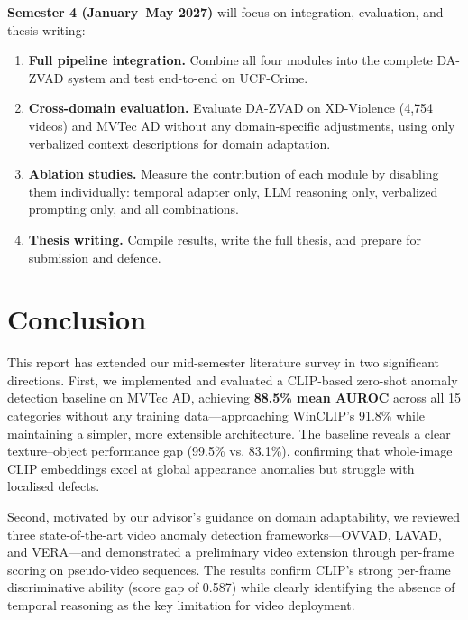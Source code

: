 \noindent\textbf{Semester 4 (January--May 2027)} will focus on integration, evaluation, and thesis writing:

\begin{enumerate}[leftmargin=*]
    \item \textbf{Full pipeline integration.} Combine all four modules into the complete DA-ZVAD system and test end-to-end on UCF-Crime.

    \item \textbf{Cross-domain evaluation.} Evaluate DA-ZVAD on XD-Violence (4{,}754 videos) and MVTec AD without any domain-specific adjustments, using only verbalized context descriptions for domain adaptation.

    \item \textbf{Ablation studies.} Measure the contribution of each module by disabling them individually: temporal adapter only, LLM reasoning only, verbalized prompting only, and all combinations.

    \item \textbf{Thesis writing.} Compile results, write the full thesis, and prepare for submission and defence.
\end{enumerate}


\section{Conclusion}
\label{sec:conclusion}

This report has extended our mid-semester literature survey in two significant directions. First, we implemented and evaluated a CLIP-based zero-shot anomaly detection baseline on MVTec AD, achieving \textbf{88.5\% mean AUROC} across all 15 categories without any training data---approaching WinCLIP's 91.8\% while maintaining a simpler, more extensible architecture. The baseline reveals a clear texture--object performance gap (99.5\% vs. 83.1\%), confirming that whole-image CLIP embeddings excel at global appearance anomalies but struggle with localised defects.

Second, motivated by our advisor's guidance on domain adaptability, we reviewed three state-of-the-art video anomaly detection frameworks---OVVAD, LAVAD, and VERA---and demonstrated a preliminary video extension through per-frame scoring on pseudo-video sequences. The results confirm CLIP's strong per-frame discriminative ability (score gap of 0.587) while clearly identifying the absence of temporal reasoning as the key limitation for video deployment.

